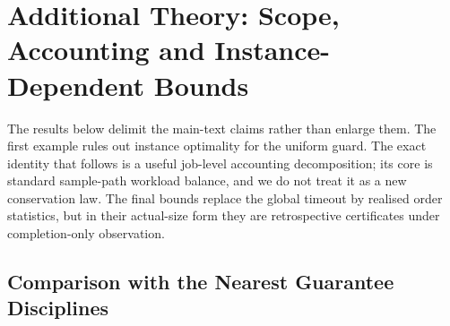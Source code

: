 \providecommand{\devnum}[1]{#1}

\section{Additional Theory: Scope, Accounting and Instance-Dependent Bounds}
\label{sec:supp_theory_additions}

The results below delimit the main-text claims rather than enlarge them. The first
example rules out instance optimality for the uniform guard.
The exact identity that follows is a useful job-level accounting decomposition;
its core is standard sample-path workload balance, and we do not treat it as a
new conservation law. The final bounds replace the global timeout by realised
order statistics, but in their actual-size form they are retrospective
certificates under completion-only observation.

\subsection{Comparison with the Nearest Guarantee Disciplines}

